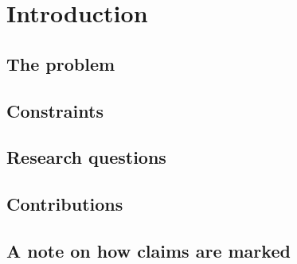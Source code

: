 \section{Introduction}

\subsection{The problem}

\subsection{Constraints}
\label{sec:intro-neutrality}

\subsection{Research questions}

\subsection{Contributions}

\subsection{A note on how claims are marked}

